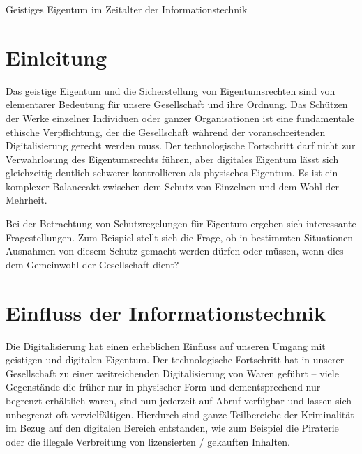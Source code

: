 \documentclass[journal]{IEEEtran}
\begin{document}

\begin{onecolumn}

\begin{center}
	\Large{Geistiges Eigentum im Zeitalter der Informationstechnik}\\
	\vspace{18pt}\hline
\end{center}

\tableofcontents
    
\section{Einleitung}

Das geistige Eigentum und die Sicherstellung von Eigentumsrechten sind von elementarer 
Bedeutung für unsere Gesellschaft und ihre Ordnung. Das Schützen der Werke einzelner 
Individuen oder ganzer Organisationen ist eine fundamentale ethische Verpflichtung, der 
die Gesellschaft während der voranschreitenden Digitalisierung gerecht werden muss. Der 
technologische Fortschritt darf nicht zur Verwahrlosung des Eigentumsrechts führen, aber 
digitales Eigentum lässt sich gleichzeitig deutlich schwerer kontrollieren als physisches 
Eigentum. Es ist ein komplexer Balanceakt zwischen dem Schutz von Einzelnen und dem Wohl 
der Mehrheit.

Bei der Betrachtung von Schutzregelungen für Eigentum ergeben sich interessante
Fragestellungen. Zum Beispiel stellt sich die Frage, ob in bestimmten Situationen 
Ausnahmen von diesem Schutz gemacht werden dürfen oder müssen, wenn dies dem Gemeinwohl 
der Gesellschaft dient?

\section{Einfluss der Informationstechnik}

Die Digitalisierung hat einen erheblichen Einfluss auf unseren Umgang 
mit geistigen und digitalen Eigentum. 
Der technologische Fortschritt hat in unserer Gesellschaft zu einer weitreichenden
Digitalisierung von Waren geführt – viele Gegenstände die früher 
nur in physischer Form und dementsprechend nur begrenzt erhältlich waren, sind nun 
jederzeit auf Abruf verfügbar und lassen sich unbegrenzt oft vervielfältigen. 
Hierdurch sind ganze Teilbereiche der Kriminalität im Bezug auf den digitalen Bereich 
entstanden, wie zum Beispiel die Piraterie oder die illegale Verbreitung von
lizensierten / gekauften Inhalten.\cite{oe-it}


\end{onecolumn}
\end{document}
